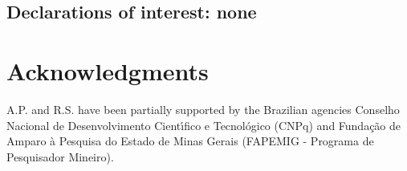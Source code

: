 \documentclass[11pt]{article}
\let\m=\mu \let\n=\nu \let\o=\omega    \let\p=\pi \let\ph=\varphi
\let\\=\noindent
\def\ee{\end{equation}}
\def\be{\begin{equation}}
\begin{document}
%


\subsection*{Declarations of interest: none}

\section*{Acknowledgments}
A.P.  and R.S. have been partially supported by the Brazilian  agencies
Conselho Nacional de Desenvolvimento Cient\'\i fico e Tecnol\'ogico
(CNPq) and  Funda\c c\~ao de Amparo \`a  Pesquisa do Estado de Minas Gerais (FAPEMIG - Programa de Pesquisador Mineiro).
\end{document}
